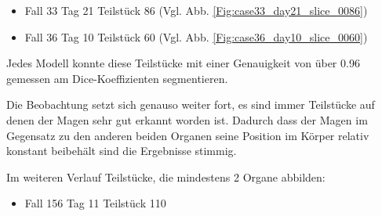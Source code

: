 \begin{itemize}
\item Fall 33 Tag 21 Teilstück 86 (Vgl. Abb. \ref{Fig:case33_day21_slice_0086})
\end{itemize}

\begin{itemize}
\item Fall 36 Tag 10 Teilstück 60 (Vgl. Abb. \ref{Fig:case36_day10_slice_0060})
\end{itemize}

Jedes Modell konnte diese Teilstücke mit einer Genauigkeit von über 0.96 gemessen am Dice-Koeffizienten segmentieren.

Die Beobachtung setzt sich genauso weiter fort, es sind immer Teilstücke auf denen der Magen sehr gut erkannt worden ist. Dadurch dass der Magen im Gegensatz zu den anderen beiden Organen seine Position im Körper relativ konstant beibehält sind die Ergebnisse stimmig.

Im weiteren Verlauf Teilstücke, die mindestens 2 Organe abbilden:

\begin{itemize}
\item Fall 156 Tag 11 Teilstück 110
\end{itemize}

\begin{table}[H]
\centering
{}
\caption{Siehe Abb. \ref{Fig:case123_day20_slice_0073}}
\end{table}

